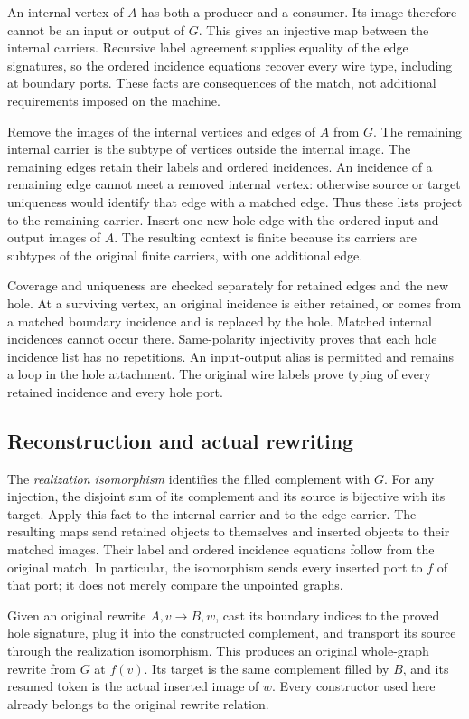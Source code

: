 An internal vertex of $A$ has both a producer and a consumer. Its image
therefore cannot be an input or output of $G$. This gives an injective map
between the internal carriers. Recursive label agreement supplies equality
of the edge signatures, so the ordered incidence equations recover every
wire type, including at boundary ports. These facts are consequences of the
match, not additional requirements imposed on the machine.

Remove the images of the internal vertices and edges of $A$ from $G$.
The remaining internal carrier is the subtype of vertices outside the
internal image. The remaining edges retain their labels and ordered
incidences. An incidence of a remaining edge cannot meet a removed internal
vertex: otherwise source or target uniqueness would identify that edge
with a matched edge. Thus these lists project to the remaining carrier.
Insert one new hole edge with the ordered input and output images of $A$.
The resulting context is finite because its carriers are subtypes of the
original finite carriers, with one additional edge.

Coverage and uniqueness are checked separately for retained edges and the
new hole. At a surviving vertex, an original incidence is either retained,
or comes from a matched boundary incidence and is replaced by the hole.
Matched internal incidences cannot occur there. Same-polarity injectivity
proves that each hole incidence list has no repetitions. An input-output
alias is permitted and remains a loop in the hole attachment. The original
wire labels prove typing of every retained incidence and every hole port.

\subsection{Reconstruction and actual rewriting}
The \emph{realization isomorphism} identifies the filled complement with
$G$. For any injection, the disjoint sum of its complement and its source
is bijective with its target. Apply this fact to the internal carrier and
to the edge carrier. The resulting maps send retained objects to themselves
and inserted objects to their matched images. Their label and ordered
incidence equations follow from the original match. In particular, the
isomorphism sends every inserted port to $f$ of that port; it does not
merely compare the unpointed graphs.

Given an original rewrite $A,v\longrightarrow B,w$, cast its boundary
indices to the proved hole signature, plug it into the constructed
complement, and transport its source through the realization isomorphism.
This produces an original whole-graph rewrite from $G$ at $f(v)$. Its target
is the same complement filled by $B$, and its resumed token is the actual
inserted image of $w$. Every constructor used here already belongs to the
original rewrite relation.


